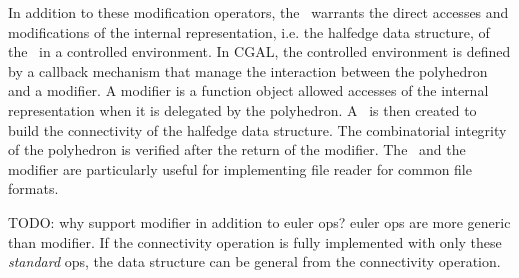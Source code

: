 In addition to these modification operators, 
the \polybuilder\ warrants the direct accesses and modifications
of the internal representation, i.e. the halfedge data structure, 
of the \poly\ in a controlled environment. In CGAL, the 
controlled environment is defined by a callback mechanism that
manage the interaction between the polyhedron and a modifier. 
A modifier is a function object allowed accesses 
of the internal representation when it is delegated by the 
polyhedron. A \polybuilder\ is then created to build  
the connectivity of the halfedge data structure.
The combinatorial integrity of the polyhedron is verified
after the return of the modifier. The \polybuilder\ and the
modifier are particularly useful for implementing file reader for 
common file formats.

TODO: why support modifier in addition to euler ops? euler ops are
more generic than modifier. If the connectivity operation
is fully implemented with only these \emph{standard} ops,
the data structure can be general from the connectivity operation.
